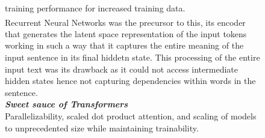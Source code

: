\documentclass[12pt]{article}
\newcommand{\sidecite}[1]{\textsuperscript{\textcolor{blue}{\textbf{\scriptsize#1}}}}
\newcommand{\maincitecount}{\sidecite{\stepcounter{maincite}\themaincite}}
\begin{document}
\begin{figure}[!htb]
\begin{minipage}[t]{0.65\textwidth}
    training performance for increased training data.\\
    Recurrent Neural Networks{\maincitecount} was the precursor to this, its encoder that generates the latent space representation of the input tokens
    working in such a way that it captures the entire meaning of the input sentence in its final hiddetn state. This processing of the 
    entire input text was its drawback as it could not access intermediate hidden states hence not capturing dependencies within words
    in the sentence.\\
    \vspace{1em}
    \small \textcolor{xtitle}{\textbf{\textit{Sweet sauce of Transformers}}}\\
    \normalsize
    Parallelizability, scaled dot product attention, and scaling of models to unprecedented size while maintaining trainability.
    

\end{minipage}
\end{figure}
\end{document}
